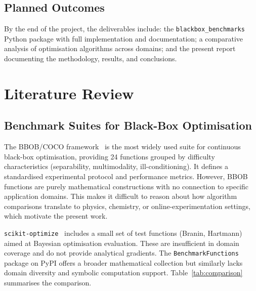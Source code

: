 \subsection{Planned Outcomes}

By the end of the project, the deliverables include: the \texttt{blackbox\_benchmarks}
Python package with full implementation and documentation; a comparative
analysis of optimisation algorithms across domains; and the present report
documenting the methodology, results, and conclusions.

\clearpage

\section{Literature Review}

\subsection{Benchmark Suites for Black-Box Optimisation}

The BBOB/COCO framework~\cite{hansen2021coco} is the most widely used suite
for continuous black-box optimisation, providing 24 functions grouped by
difficulty characteristics (separability, multimodality, ill-conditioning).
It defines a standardised experimental protocol and performance metrics.
However, BBOB functions are purely mathematical constructions with no
connection to specific application domains. This makes it difficult to reason
about how algorithm comparisons translate to physics, chemistry, or
online-experimentation settings, which motivate the present work.

\texttt{scikit-optimize}~\cite{scikit-optimize} includes a small set of test
functions (Branin, Hartmann) aimed at Bayesian optimisation evaluation. These
are insufficient in domain coverage and do not provide analytical gradients.
The \texttt{BenchmarkFunctions} package on PyPI offers a broader mathematical
collection but similarly lacks domain diversity and symbolic computation
support. Table~\ref{tab:comparison} summarises the comparison.

